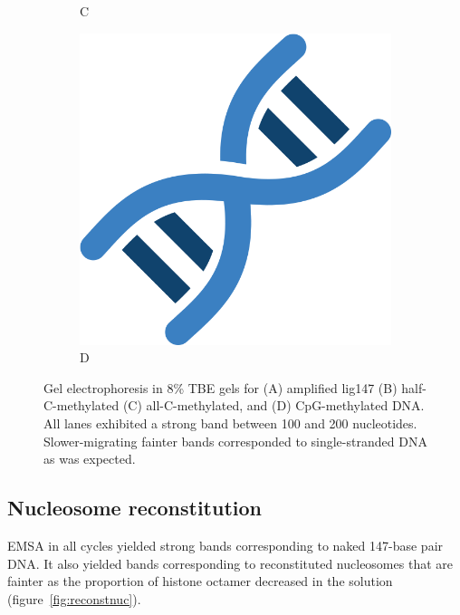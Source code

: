 \documentclass[parskip=full, numbers=noenddot]{scrreprt}
\begin{document}
\begin{figure}[htpb]
\begin{subfigure}[htpb]{0.4\textwidth}
    \caption{C}
    \label{fig:amplig_c}
  \end{subfigure}
  \begin{subfigure}[htpb]{0.4\textwidth}
    \centering
    \includegraphics[width=\textwidth]{test}
    \caption{D}
    \label{fig:amplig_d}
  \end{subfigure}
  \caption{Gel electrophoresis in 8\% TBE gels for (A) amplified lig147 (B) half-C-methylated (C) all-C-methylated, and (D) CpG-methylated DNA. All lanes exhibited a strong band between 100 and 200 nucleotides. Slower-migrating fainter bands corresponded to single-stranded DNA as was expected.}
  \label{fig:amplig}
\end{figure}

\subsection{Nucleosome reconstitution}
\label{ssec:reconstnuc}

EMSA in all cycles yielded strong bands corresponding to naked 147-base pair DNA. It also yielded bands corresponding to reconstituted nucleosomes that are fainter as the proportion of histone octamer decreased in the solution (figure~\ref{fig:reconstnuc}).
\end{document}
